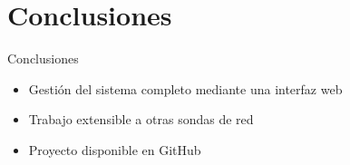 \section{Conclusiones}

\begin{frame}{Conclusiones}
  \begin{itemize}[<alert@+>]
    \item Gestión del sistema completo mediante una interfaz web
    \item Trabajo extensible a otras sondas de red
    \item Proyecto disponible en GitHub
  \end{itemize}
\end{frame}

